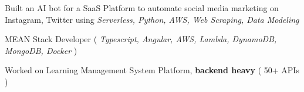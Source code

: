 \documentclass[]{deedy-resume-reversed}
\begin{document}
\vspace{\topsep} %

\begin{tightemize}
\item Built an AI bot for a SaaS Platform to automate social media marketing on Instagram, Twitter using \textit{Serverless, Python, AWS, Web Scraping, Data Modeling}
\item MEAN Stack Developer ( \textit{Typescript, Angular, AWS, Lambda, DynamoDB, MongoDB, Docker} )
\item Worked on Learning Management System Platform, \textbf{backend heavy} ( 50+ APIs )
\end{tightemize}
\sectionsep

%
%
\end{document}
